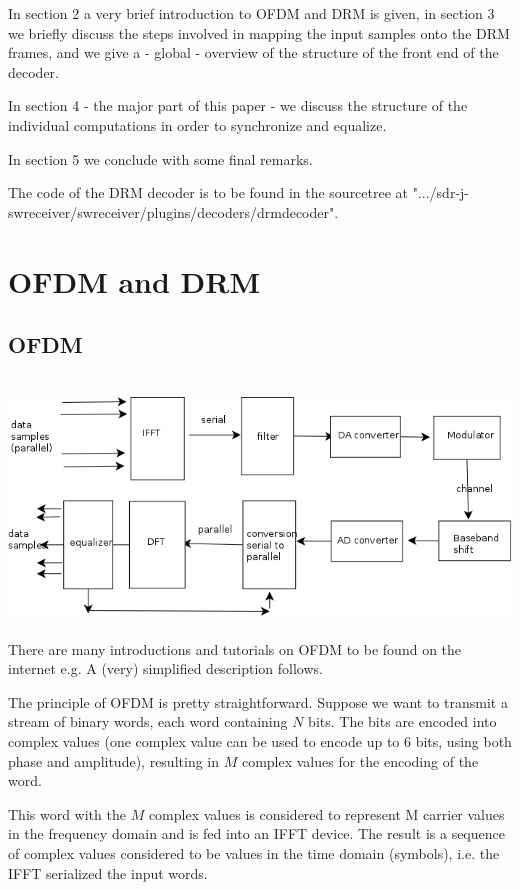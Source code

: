 \documentclass[11pt]{article}
\begin{document}
In section 2 a very brief introduction to OFDM and DRM is given,
in section 3 we briefly discuss the steps involved in mapping the
input samples onto the DRM frames, and we give a - global - overview
of the structure of the front end of the decoder.

In section 4 - the major part of this paper - we discuss the structure of the individual computations
in order to synchronize and equalize.

In section 5 we conclude with some final remarks.

The code of the DRM decoder  is to be found
in the sourcetree at ".../sdr-j-swreceiver/swreceiver/plugins/decoders/drmdecoder".

\section{OFDM and DRM}
\subsection{OFDM}
\ \\
\includegraphics[width=140mm]{ofdm.png}
\ \\
There are many introductions and tutorials on OFDM to be found
on the internet e.g. \cite{ofdm}
A (very) simplified description follows.

The principle of OFDM is pretty straightforward.
Suppose we want to transmit a stream of binary words,
each word containing $N$ bits.
The bits are encoded into complex values (one complex value can be used to
encode up to 6 bits, using both phase and amplitude), resulting
in $M$ complex values for the encoding of the word.

This word with the $M$ complex values is considered to
represent M carrier values in the frequency domain and
is fed into an IFFT device.
The result is a sequence of complex values 
considered to be values in the time domain (symbols), i.e.
the IFFT serialized the input words.
\end{document}
